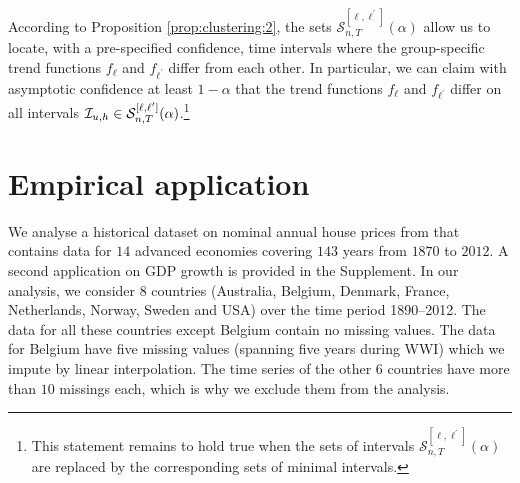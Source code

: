 \documentclass[12pt]{article}
\begin{document}
According to Proposition \ref{prop:clustering:2}, the sets $\mathcal{S}^{[\ell,\ell^\prime]}_{n, T}(\alpha)$ allow us to locate, with a pre-specified confidence, time intervals where the group-specific trend functions $f_\ell$ and $f_{\ell^\prime}$ differ from each other. In particular, we can claim with asymptotic confidence at least $1 - \alpha$ that the trend functions $f_\ell$ and $f_{\ell^\prime}$ differ on all intervals $\mathcal{I}_{u, h} \in \mathcal{S}^{[\ell,\ell^\prime]}_{n, T}(\alpha)$.\footnote{This statement remains to hold true when the sets of intervals $\mathcal{S}^{[\ell,\ell^\prime]}_{n, T}(\alpha)$ are replaced by the corresponding sets of minimal intervals.} 



\section{Empirical application}\label{sec:app}


We analyse a historical dataset on nominal annual house prices from \cite{Knoll2017} that contains data for $14$ advanced economies covering $143$ years from $1870$ to $2012$. 
A second application on GDP growth is provided in the Supplement. 
In our analysis, we consider 8 countries (Australia, Belgium, Denmark, France, Netherlands, Norway, Sweden and USA) over the time period 1890--2012. The data for all these countries except Belgium contain no missing values. The data for Belgium have five missing values (spanning five years during WWI) 
which we impute by linear interpolation. The time series of the other $6$ countries have more than $10$ missings each, which is why we exclude them from the analysis.
\end{document}
